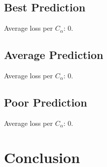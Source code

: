 \documentclass[11pt]{article}
\begin{document}
\subsection{Best Prediction}
Average loss per $C_{\alpha}$: $0.$
\subsection{Average Prediction}
Average loss per $C_{\alpha}$: $0.$

\subsection{Poor Prediction}
Average loss per $C_{\alpha}$: $0.$


\section{Conclusion}
\end{document}
